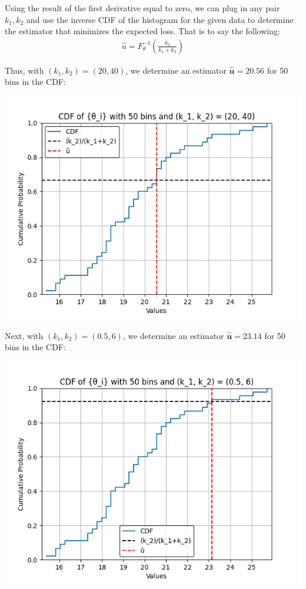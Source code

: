 Using the result of the first derivative equal to zero, we can plug in any pair $k_1, k_2$ and use the inverse CDF of the histogram for the given data to determine the estimator that minimizes the expected loss. That is to say the following:
\begin{align*}
    \hat{u} = F_\theta^{-1}\left(\frac{k_2}{k_1+k_2}\right)
\end{align*}

Thus, with $(k_1, k_2) = (20, 40)$, we determine an estimator $\mathbf{\hat{u}=20.56}$ for 50 bins in the CDF:
\begin{center}
\includegraphics[scale=0.8]{data/05_reporting/problem_set_2/pset2p2.5.1.png}
\end{center}

Next, with $(k_1, k_2) = (0.5, 6)$, we determine an estimator $\mathbf{\hat{u}=23.14}$ for 50 bins in the CDF:
\begin{center}
\includegraphics[scale=0.8]{data/05_reporting/problem_set_2/pset2p2.5.2.png}
\end{center}
